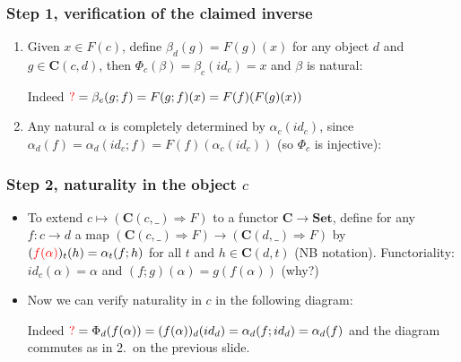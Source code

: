 \documentclass[handout]{beamer}
\newcommand{\To}{\Rightarrow}
\newcommand{\redc}{{\color{red} c}}
\newcommand{\bfsf}[1]{{\boldsymbol{#1}}}
\newcommand{\Set}{\bfsf{Set}}
\newcommand{\CC}{\bfsf{C}}
\begin{document}
\frame
  {   
    \frametitle{Step 1, verification of the claimed inverse}\label{Yon:bijection}

 \begin{enumerate}[<+->]
\item Given $x\in F(c)$, define $\beta_d(g)=F(g)(x)$ for any object $d$ 
and $g\in\CC(c,d)$, then $\Phi_c(\beta)=\beta_c(id_c) =x$ and $\beta$ is natural:
Indeed ${\color{red} ?}=\beta_e(g;f)=F(g;f)(x) = F(f)(F(g)(x))$
\item Any natural $\alpha$ is completely determined by $\alpha_c(id_c)$, 
since $\alpha_d(f)=\alpha_d(id_c;f)=F(f)(\alpha_c(id_c))$
(so $\Phi_c$ is injective):\\
 \end{enumerate}

 }

\frame
  {   
    \frametitle{Step 2, naturality in the object $c$}\label{Yon:natural_in_c}

 \begin{itemize}[<+->]
\item To extend $c\mapsto(\CC(c,\_)\To F)$ to a functor $\CC\to\Set$, define
for any $f:c\to d$ a map $(\CC(c,\_)\To F)\to(\CC(d,\_)\To F)$ by
$({\color{red}f(\alpha)})_t (h) = \alpha_t(f;h)$ for all $t$ and $h\in\CC(d,t)$ 
(NB {\color{red}notation}).
Functoriality: $id_c(\alpha) = \alpha$ and $(f;g)(\alpha) = g(f(\alpha))$ (why?)
\item Now we can verify naturality in $c$ in the following diagram:

Indeed ${\color{red} ?}=\Phi_d(f(\alpha)) = (f(\alpha))_d(id_d) = \alpha_d(f;id_d) = \alpha_d(f)$
and the diagram commutes as in 2.\ on the previous slide.
 \end{itemize}

 }
\end{document}
